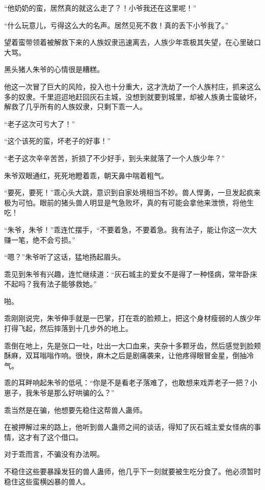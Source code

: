 
\begin{this_body}



“他奶奶的蛮，居然真的就这么走了？！小爷我还在这里呢！”

“什么玩意儿，亏得这么大的名声。居然见死不救！真的丢下小爷我了。”

望着蛮带领着被解救下来的人族奴隶迅速离去，人族少年乖极其失望，在心里破口大骂。

黑头猪人朱爷的心情很是糟糕。

他这一次冒了巨大的风险，投入也十分重大，这才洗劫了一个人族村庄，抓来这么多的奴隶。千里迢迢地赶回灰石主城，没想到就要到城里，却被人族勇士蛮破坏，解救了几乎所有的人族奴隶，只剩下乖一人。

“老子这次可亏大了！”

“这个该死的蛮，坏老子的好事！”

“老子这次辛辛苦苦，折损了不少好手，到头来就落了一个人族少年？”

朱爷双眼通红，死死地瞪着乖，朝天鼻中喘着粗气。

“要死，要死！”乖心头大跳，意识到自家处境相当不妙。兽人悍勇，一旦发起疯来极为可怕。眼前的猪头兽人明显是气急败坏，真的有可能会拿他来泄愤，将他生吃！

“朱爷，朱爷！”乖连忙摆手，“不要着急，不要着急。我有法子，能让你这一次大赚一笔，绝不会亏损。”

“嗯？”朱爷听了这话，猛地扬起眉头。

乖见到朱爷有兴趣，连忙继续道：“灰石城主的爱女不是得了一种怪病，常年卧床不起吗？我有法子能够救她。”

啪。

乖刚刚说完，朱爷伸手就是一巴掌，打在乖的脸颊上，把这个身材瘦弱的人族少年打得飞起，然后摔落到十几步外的地上。

乖倒在地上，先是张口一吐，吐出一大口血来，夹杂十多颗牙齿，然后感觉到脸颊酥麻，双耳嗡嗡作响。很快，麻木之后是剧痛袭来，让他疼得眼冒金星，倒抽冷气。

乖的耳畔响起朱爷的低吼：“你是不是看老子落难了，也敢想来戏弄老子一把？小崽子，我朱爷是那么好哄骗的么？”

乖当然是在骗，他想要先稳住这帮兽人蛊师。

在被押解过来的路上，他听到兽人蛊师之间的谈话，得知了灰石城主爱女怪病的事情，这才有了这个借口。

对于乖而言，不骗没有办法啊。

不稳住这些要暴躁发狂的兽人蛊师，他几乎下一刻就要被生吃分食了。他必须暂时稳住这些蛮横凶暴的兽人。


\end{this_body}

